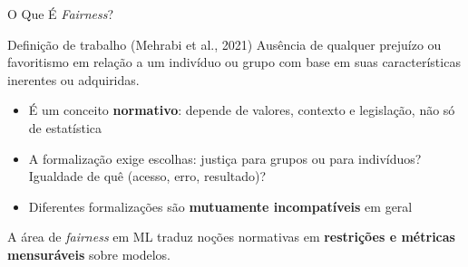 \documentclass[aspectratio=169,xcolor=dvipsnames]{beamer}
\begin{document}
  \begin{frame}{O Que É \textit{Fairness}?}
    \begin{block}{Definição de trabalho (Mehrabi et al., 2021)}
      Ausência de qualquer prejuízo ou favoritismo em relação a um indivíduo ou grupo com base em suas características inerentes ou adquiridas.
    \end{block}

    \vspace{0.4em}
    \begin{itemize}\setlength{\itemsep}{0.3em}
      \item É um conceito \textbf{normativo}: depende de valores, contexto e legislação, não só de estatística
      \item A formalização exige escolhas: justiça para grupos ou para indivíduos? Igualdade de quê (acesso, erro, resultado)?
      \item Diferentes formalizações são \textbf{mutuamente incompatíveis} em geral
    \end{itemize}

    \vspace{0.3em}
    A área de \textit{fairness} em ML traduz noções normativas em \textbf{restrições e métricas mensuráveis} sobre modelos.
  \end{frame}
\end{document}
